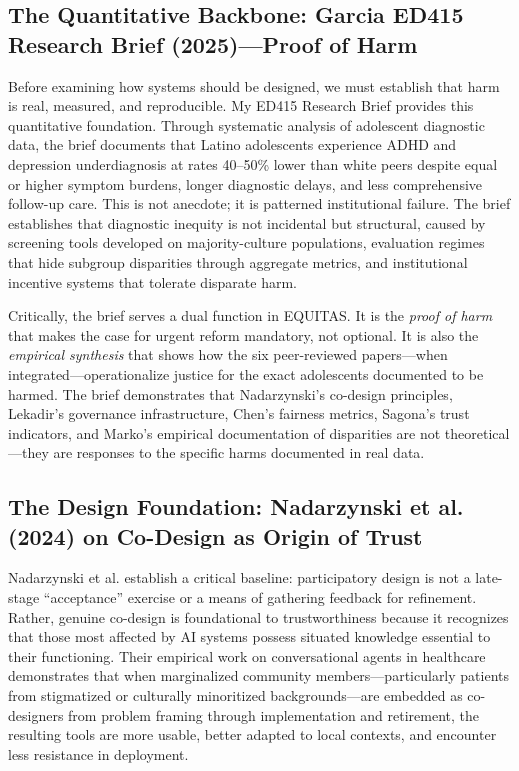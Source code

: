 \documentclass[12pt,a4paper]{article}
\begin{document}
\subsection{The Quantitative Backbone: Garcia ED415 Research Brief (2025)---Proof of Harm}

Before examining how systems should be designed, we must establish that harm is real, measured, and reproducible. My ED415 Research Brief provides this quantitative foundation. Through systematic analysis of adolescent diagnostic data, the brief documents that Latino adolescents experience ADHD and depression underdiagnosis at rates 40--50\% lower than white peers despite equal or higher symptom burdens, longer diagnostic delays, and less comprehensive follow-up care.\cite{garcia_ed415} This is not anecdote; it is patterned institutional failure. The brief establishes that diagnostic inequity is not incidental but structural, caused by screening tools developed on majority-culture populations, evaluation regimes that hide subgroup disparities through aggregate metrics, and institutional incentive systems that tolerate disparate harm.\cite{garcia_ed415}

Critically, the brief serves a dual function in EQUITAS. It is the \textit{proof of harm} that makes the case for urgent reform mandatory, not optional. It is also the \textit{empirical synthesis} that shows how the six peer-reviewed papers---when integrated---operationalize justice for the exact adolescents documented to be harmed. The brief demonstrates that Nadarzynski's co-design principles, Lekadir's governance infrastructure, Chen's fairness metrics, Sagona's trust indicators, and Marko's empirical documentation of disparities are not theoretical—they are responses to the specific harms documented in real data.\cite{garcia_ed415}

\subsection{The Design Foundation: Nadarzynski et al. (2024) on Co-Design as Origin of Trust}

Nadarzynski et al. establish a critical baseline: participatory design is not a late-stage ``acceptance'' exercise or a means of gathering feedback for refinement. Rather, genuine co-design is foundational to trustworthiness because it recognizes that those most affected by AI systems possess situated knowledge essential to their functioning.\cite{nadarzynski2024} Their empirical work on conversational agents in healthcare demonstrates that when marginalized community members—particularly patients from stigmatized or culturally minoritized backgrounds—are embedded as co-designers from problem framing through implementation and retirement, the resulting tools are more usable, better adapted to local contexts, and encounter less resistance in deployment.\cite{nadarzynski2024}
\end{document}
